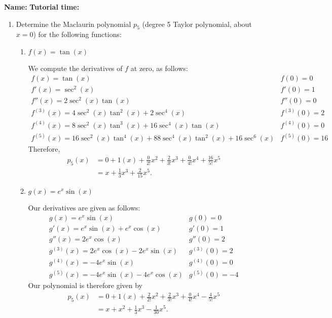 \documentclass[12pt]{article}
\begin{document}
{\bf \large Name:} \hspace{2.5in} {\bf Tutorial time:}

\bigskip

\bigskip

\thispagestyle{fancy}

\begin{enumerate}
 \item Determine the Maclaurin polynomial $p_5$ (degree 5 Taylor polynomial, about $x=0$) for the following functions:
\begin{enumerate}
 \item $f(x) = \tan(x)$

\bigskip

We compute the derivatives of $f$ at zero, as follows:
\[
 \begin{array}{ll}
  f(x)=\tan(x) & f(0)= 0\\
  f'(x)=\sec^2(x) & f'(0)=1\\
  f''(x)=2\sec^2(x)\tan(x)&f''(0)=0\\
  f^{(3)}(x)=4\sec^2(x)\tan^2(x)+2\sec^4(x) & f^{(3)}(0)=2\\
  f^{(4)}(x)=8\sec^2(x)\tan^3(x)+16\sec^4(x)\tan(x) & f^{(4)}(0)=0\\
  f^{(5)}(x)=16\sec^2(x)\tan^4(x)+88\sec^4(x)\tan^2(x)+16\sec^6(x) & f^{(5)}(0) = 16
 \end{array}
\]
Therefore,
\begin{align*}
 p_5(x)& = 0+1(x)+\frac{0}{2!}x^2+\frac{2}{3!}x^3+\frac{0}{4!}x^4+\frac{16}{5!}x^5\\
 & = x+\frac{1}{3}x^3+\frac{2}{15}x^5.
\end{align*}

\medskip

 \item $g(x) = e^x\sin(x)$

\bigskip

Our derivatives are given as follows:
\[
 \begin{array}{ll}
  g(x)=e^x\sin(x) & g(0) = 0\\
  g'(x)=e^x\sin(x)+e^x\cos(x) & g'(0)=1\\
  g''(x) = 2e^x\cos(x) & g''(0)=2\\
  g^{(3)}(x) = 2e^x\cos(x)-2e^x\sin(x) & g^{(3)}(0) = 2\\
  g^{(4)}(x) = -4e^x\sin(x) & g^{(4)}(0) = 0\\
  g^{(5)}(x) = -4e^x\sin(x)-4e^x\cos(x) & g^{(5)}(0) = -4
 \end{array}
\]
Our polynomial is therefore given by
\begin{align*}
 p_5(x) &= 0 + 1(x)+\frac{2}{2!}x^2+\frac{2}{3!}x^3+\frac{0}{4!}x^4-\frac{4}{5!}x^5\\
 & = x+x^2+\frac{1}{3}x^3-\frac{1}{30}x^5.
\end{align*}




\end{enumerate}
\end{enumerate}
\end{document}
